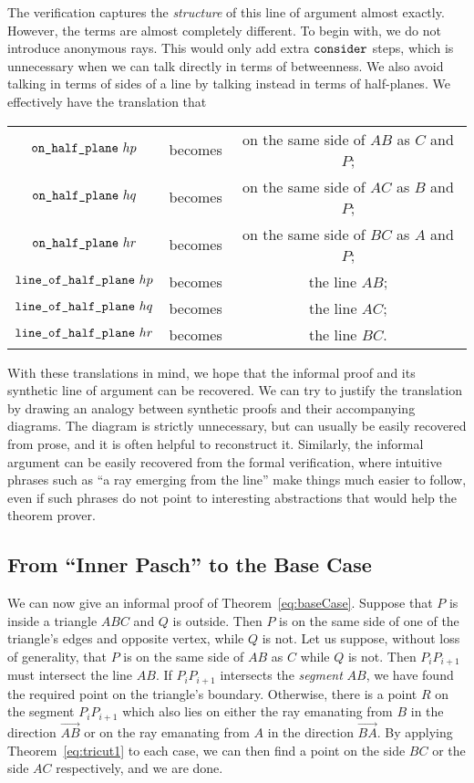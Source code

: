 The verification captures the \emph{structure} of this line of argument almost exactly. However, the terms are almost completely different. To begin with, we do not introduce anonymous rays. This would only add extra $\texttt{consider}$ steps, which is unnecessary when we can talk directly in terms of betweenness. We also avoid talking in terms of sides of a line by talking instead in terms of half-planes. We effectively have the translation that

\label{sec:HalfPlaneTranslations}
\begin{tabular}{ccc}
  $\texttt{on\_half\_plane}\ hp$ & becomes & on the same side of $AB$ as $C$ and $P$;\\
  $\texttt{on\_half\_plane}\ hq$ & becomes & on the same side of $AC$ as $B$ and $P$;\\
  $\texttt{on\_half\_plane}\ hr$ & becomes & on the same side of $BC$ as $A$ and $P$;\\
  $\texttt{line\_of\_half\_plane}\ hp$ & becomes & the line $AB$; \\
  $\texttt{line\_of\_half\_plane}\ hq$ & becomes & the line $AC$; \\ 
  $\texttt{line\_of\_half\_plane}\ hr$ & becomes & the line $BC$. \\
\end{tabular}

With these translations in mind, we hope that the informal proof and its synthetic line of argument can be  recovered. We can try to justify the translation by drawing an analogy between synthetic proofs and their accompanying diagrams. The diagram is strictly unnecessary, but can usually be easily recovered from prose, and it is often helpful to reconstruct it. Similarly, the informal argument can be easily recovered from the formal verification, where intuitive phrases such as ``a ray emerging from the line'' make things much easier to follow, even if such phrases do not point to interesting abstractions that would help the theorem prover.

\subsection{From ``Inner Pasch'' to the Base Case}\label{sec:JordanBaseCase1}
We can now give an informal proof of Theorem~\ref{eq:baseCase}. Suppose that $P$ is inside a triangle $ABC$ and $Q$ is outside. Then $P$ is on the same side of one of the triangle's edges and opposite vertex, while $Q$ is not. Let us suppose, without loss of generality, that $P$ is on the same side of $AB$ as $C$ while $Q$ is not. Then $P_iP_{i+1}$ must intersect the line $AB$. If $P_iP_{i+1}$ intersects the \emph{segment} $AB$, we have found the required point on the triangle's boundary. Otherwise, there is a point $R$ on the segment $P_iP_{i+1}$ which also lies on either the ray emanating from $B$ in the direction $\overrightarrow{AB}$ or on the ray emanating from $A$ in the direction $\overrightarrow{BA}$. By applying Theorem~\ref{eq:tricut1} to each case, we can then find a point on the side $BC$ or the side $AC$ respectively, and we are done.

